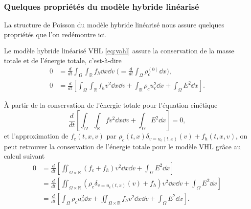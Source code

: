 \subsubsection*{Quelques propriétés du modèle hybride linéarisé}

La structure de Poisson du modèle hybride linéarisé nous assure quelques propriétés que l'on redémontre ici.

\begin{pro}\label{p:vhl_conservation}
  Le modèle hybride linéarisé VHL \eqref{eq:vahl} assure la conservation de la masse totale et de l'énergie totale, c'est-à-dire
  $$
    \begin{aligned}
      0 &= \frac{d}{dt}  \int_\Omega \int_{\mathbb{R}} f_h \dd{x}\dd{v} \; \Big( \! = \frac{d}{dt}  \int_\Omega \rho^{(0)}_c \dd{x}\Big), \\
      0 &= \frac{d}{dt} \left[ \int_\Omega \int_{\mathbb{R}} f_h v^2 \dd{x}\dd{v}+ \int_{\mathbb{R}} \rho_c u_c ^2 \dd{x}+  \int_\Omega E^2 \dd{x}\right].
    \end{aligned}
  $$
\end{pro}

\begin{remark}
  À partir de la conservation de l'énergie totale pour l'équation cinétique 
  $$
    \frac{d}{dt} \left[ \int_\Omega \int_{\mathbb{R}} f v^2 \dd{x}\dd{v} + \int_\Omega E^2 \dd{x}\right] = 0, 
  $$
  et l'approximation de $f_c(t, x, v)$ par $\rho_c(t, x) \delta_{v=u_c(t, x)}(v) + f_h(t, x, v)$, on peut retrouver la conservation de l'énergie totale pour le modèle VHL grâce au calcul suivant 
  $$
    \begin{aligned}
      0 &= \frac{d}{dt} \left[ \iint_{\Omega\times\mathbb{R}} (f_c + f_h) v^2 \dd{x}\dd{v} + \int_\Omega E^2 \dd{x}\right] \\
        &= \frac{d}{dt} \left[\iint_{\Omega\times\mathbb{R}} (\rho_c \delta_{v=u_c(t, x)}(v)  + f_h) v^2 \dd{x}\dd{v} + \int_\Omega E^2 \dd{x}\right] \\
        &= \frac{d}{dt} \left[ \int_\Omega \rho_c u_c^2 \dd{x}+ \iint_{\Omega\times\mathbb{R}} f_h v^2 \dd{x}\dd{v} + \int_\Omega E^2 \dd{x}\right]. 
    \end{aligned}
  $$
\end{remark}

